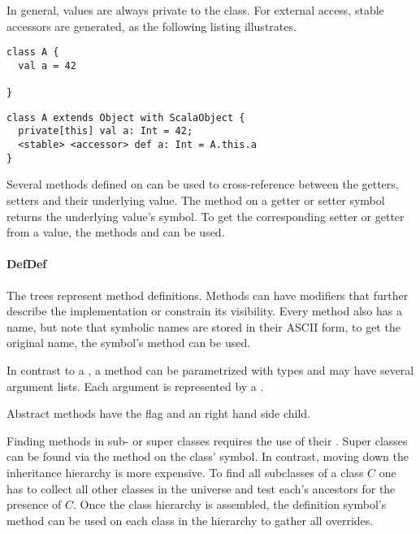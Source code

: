 In general, values are always private to the class. For external access, stable accessors are generated, as the following listing illustrates.

\begin{multicols}{2}
\begin{lstlisting}
class A {
  val a = 42

}
\end{lstlisting}
\begin{lstlisting}
class A extends Object with ScalaObject {
  private[this] val a: Int = 42;
  <stable> <accessor> def a: Int = A.this.a
}
\end{lstlisting}
\end{multicols}

Several methods defined on  can be used to cross-reference between the getters, setters and their underlying value. The  method on a getter or setter symbol returns the underlying value's symbol. To get the corresponding setter or getter from a value, the methods  and  can be used.

\paragraph{DefDef} 

\noindent The  trees represent method definitions. Methods can have modifiers that further describe the implementation or constrain its visibility. Every method also has a name, but note that symbolic names are stored in their ASCII form, to get the original name, the symbol's  method can be used.

In contrast to a , a method can be parametrized with types and may have several argument lists. Each argument is represented by a .

Abstract methods have the  flag and an  right hand side child.

Finding methods in sub- or super classes requires the use of their . Super classes can be found via the  method on the class' symbol. In contrast, moving down the inheritance hierarchy is more expensive. To find all subclasses of a class $C$ one has to collect all other classes in the universe and test each's ancestors for the presence of $C$. Once the class hierarchy is assembled, the definition symbol's  method can be used on each class in the hierarchy to gather all overrides.

